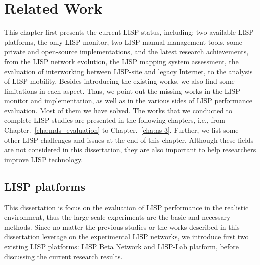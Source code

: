 
\chapter{Related Work}
\label{cha:related_work}

\ifpdf
    \graphicspath{{Chapter3/Pics/Raster/}{Chapter3/Pics/PDF/}{Chapter3/}}
\else
    \graphicspath{{Chapter3/Pics/Vector/}{Chapter3/}}
\fi
This chapter first presents the current LISP status, including: two available LISP platforms, the only LISP monitor, two LISP manual management tools, some private and open-source implementations, and the latest research achievements, from the LISP network evolution, the LISP mapping system assessment, the evaluation of interworking between LISP-site and legacy Internet, to the analysis of LISP mobility. Besides introducing the existing works, we also find some limitations in each aspect. Thus, we point out the missing works in the LISP monitor and implementation, as well as in the various sides of LISP performance evaluation. Most of them we have solved. The works that we conducted to complete LISP studies are presented in the following chapters, i.e., from Chapter.~\ref{cha:mds_evaluation} to Chapter.~\ref{cha:ns-3}. Further, we list some other LISP challenges and issues at the end of this chapter. Although these fields are not considered in this dissertation, they are also important to help researchers improve LISP technology.


\section{LISP platforms}
\label{sec:platform}
This dissertation is focus on the evaluation of LISP performance in the realistic environment, thus the large scale experiments are the basic and necessary methods. Since no matter the previous studies or the works described in this dissertation leverage on the experimental LISP networks, we introduce first two existing LISP platforms: LISP Beta Network and LISP-Lab platform, before discussing the current research results.

